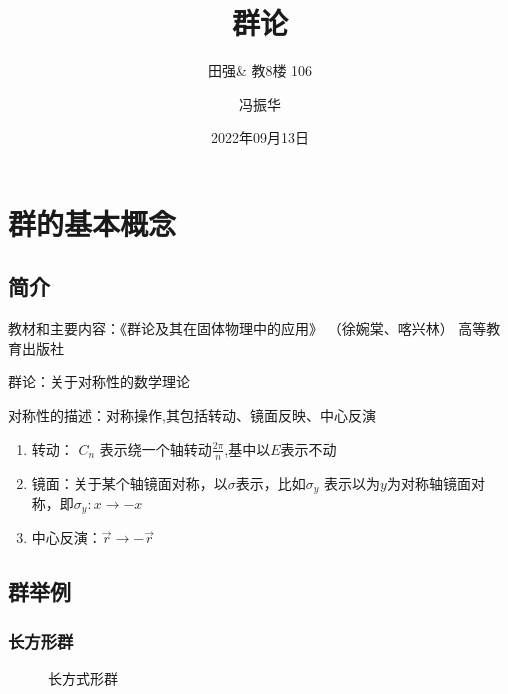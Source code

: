 \documentclass[math=mtpro2,lang=cn,color=green,device=pad]{elegantbook}
\begin{document}
\title{群论}
\subtitle{田强\& 教8楼 106}
\author{冯振华}
\date{2022年09月13日}
\maketitle
\frontmatter
\tableofcontents
\mainmatter

\chapter{群的基本概念}

\section{简介}

教材和主要内容：《群论及其在固体物理中的应用》 （徐婉棠、喀兴林） 高等教育出版社

群论：关于对称性的数学理论

对称性的描述：对称操作,其包括转动、镜面反映、中心反演

\begin{enumerate}
   \item 转动： $C_n$ 表示绕一个轴转动$\frac{2\pi}{n}$,基中以$E$表示不动
   \item 镜面：关于某个轴镜面对称，以$\sigma$表示，比如$\sigma_y$ 表示以为$y$为对称轴镜面对称，即$\sigma_y : x\rightarrow -x$
   \item 中心反演：$\vec{r}\rightarrow -\vec{r}$
\end{enumerate}

\section{群举例}

\subsection{长方形群}

\begin{figure}[H]
   \centering
   \caption{长方式形群}
   \label{fig:group1}
\end{figure}
\end{document}
